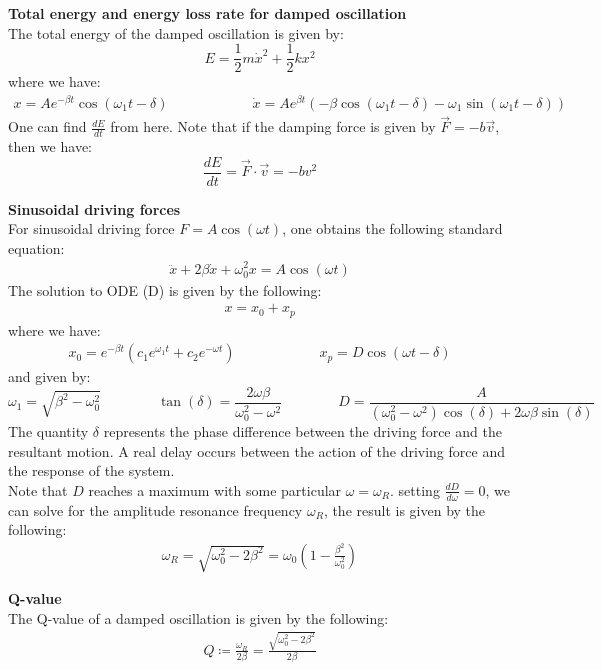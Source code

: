 \documentclass[11pt,oneside]{book}
\theoremstyle{break}
\theoremstyle{break}
\begin{document}
\textbf{Total energy and energy loss rate for damped oscillation}\\
The total energy of the damped oscillation is given by:
$$E = \frac{1}{2}m\dot{x}^2 + \frac{1}{2}kx^2$$
where we have:
\begin{align*}
x= Ae^{-\beta t}  \cos(\omega_1 t-\delta)\qquad\qquad\qquad \dot{x}=Ae^{\beta t}\left(-\beta \cos(\omega_1 t-\delta) - \omega_1 \sin(\omega_1 t-\delta) \right)
\end{align*}
One can find $\frac{dE}{dt}$ from here. Note that if the damping force is given by $\vec{F} = -b\vec{v}$, then we have: $$\frac{dE}{dt} = \vec{F}\cdot \vec{v} = -bv^2$$ 


\textbf{Sinusoidal driving forces}\\
For sinusoidal driving force $F = A\cos(\omega t)$, one obtains the following standard equation:
\begin{align*}
\ddot{x} + 2\beta \dot{x} + \omega_0^2 x = A\cos(\omega t) \tag{D}
\end{align*}
The solution to ODE (D) is given by the following:
\begin{align*}
x = x_0 + x_p
\end{align*}
where we have:
\begin{align*}
x_0 = e^{-\beta t} (c_1 e^{\omega_1 t} + c_2 e^{-\omega t} )\qquad\qquad\qquad x_p = D\cos(\omega t- \delta)
\end{align*}
and given by: 
$$\omega_1 = \sqrt{\beta^2 - \omega_0^2} \qquad\qquad \tan(\delta) = \frac{2\omega \beta}{\omega_0^2 - \omega^2}\qquad\qquad D = \frac{A}{(\omega_0^2 -\omega^2 ) \cos(\delta) +2 \omega\beta \sin(\delta)}$$
The quantity $\delta$ represents the phase difference between the driving force and the resultant motion. A real delay occurs between the action of the driving force and the response of the system.\\

Note that $D$ reaches a maximum with some particular $\omega = \omega_R$. setting $\frac{dD}{d\omega} = 0$, we can solve for the amplitude resonance frequency $\omega_R$, the result is given by the following:
\begin{align*}
\omega_R = \sqrt{\omega_0^2 - 2\beta^2} = \omega_0 \left( 1- \frac{\beta^2}{\omega_0^2}\right)
\end{align*}

\hfill\break\hfill\break
\textbf{Q-value}\\
The Q-value of a damped oscillation is given by the following:
\begin{align*}
Q\coloneqq \frac{\omega_R}{2\beta} = \frac{\sqrt{\omega_0^2 - 2\beta^2}}{2\beta}
\end{align*}
\end{document}
